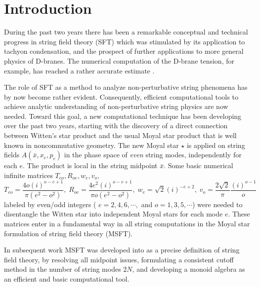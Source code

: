 \documentclass[a4paper,11pt]{article}
\begin{document}

\section{Introduction}

During the past two years there has been a remarkable conceptual and
technical progress in string field theory (SFT) which was stimulated by its
application \cite{VSFT} to tachyon condensation, and the prospect of further
applications to more general physics of D-branes. The numerical computation
of the D-brane tension, for example, has reached a rather accurate estimate
\cite{Numerics}.

The role of SFT \cite{Witten} as a method to analyze non-perturbative string
phenomena has by now become rather evident. Consequently, efficient
computational tools to achieve analytic understanding of non-perturbative
string physics are now needed. Toward this goal, a new computational
technique has been developing over the past two years, starting with the
discovery \cite{B} of a direct connection between Witten's star product and
the usual Moyal star product that is well known in noncommutative geometry.
The new Moyal star $\star $ is applied on string fields $A\left( \bar{x}%
,x_{e},p_{e}\right) $ in the phase space of \textit{even} string modes,
independently for each $e.$ The product is local in the string midpoint $%
\bar{x}.$ Some basic numerical infinite matrices $T_{eo},R_{oe},w_{e},v_{o},$
\begin{equation}
T_{eo}=\frac{4o\left( i\right) ^{o-e+1}}{\pi \left( e^{2}-o^{2}\right) }%
,\;R_{oe}=\frac{4e^2\left( i\right) ^{o-e+1}}{\pi o\left( e^{2}-o^{2}\right)
},\;w_{e}=\sqrt{2}\left( i\right) ^{-e+2},\;v_{o}=\frac{2\sqrt{2}}{\pi }%
\frac{\left( i\right) ^{o-1}}{o}  \label{TRwv}
\end{equation}%
labeled by even/odd integers ( $e=2,4,6,\cdots ,$ and $o=1,3,5,\cdots $)
were needed to disentangle the Witten star into independent Moyal stars for
each mode $e.$ These matrices enter in a fundamental way in all string
computations in the Moyal star formulation of string field theory (MSFT).

In subsequent work \cite{BM1, BM2} MSFT was developed into as a precise
definition of string field theory, by resolving all midpoint issues,
formulating a consistent cutoff method in the number of string modes $2N$,
and developing a monoid algebra as an efficient and basic computational tool.
\end{document}

